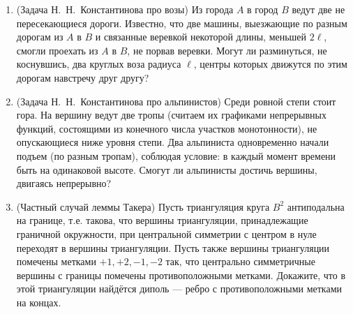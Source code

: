 \documentclass[12pt]{article}
\renewcommand{\le}{\leqslant}
\def\ra{\rightarrow}
\def\RR{\mathbb{R}}
\begin{document}
\begin{enumerate}
  \item (Задача Н.~Н.~Константинова про возы) Из города $A$ в город $B$ ведут две не пересекающиеся дороги. Известно, что две машины, выезжающие по разным дорогам из $A$ в $B$ и связанные веревкой некоторой длины, меньшей $2\ell$, смогли проехать из $A$ в $B$, не порвав веревки. Могут ли разминуться, не коснувшись, два круглых воза радиуса $\ell$, центры которых движутся по этим дорогам навстречу друг другу?

  \item (Задача Н.~Н.~Константинова про альпинистов) Среди ровной степи стоит гора. На вершину ведут две тропы (считаем их графиками непрерывных функций, состоящими из конечного числа участков монотонности), не опускающиеся ниже уровня степи. Два альпиниста одновременно начали подъем (по разным тропам), соблюдая условие: в каждый момент времени быть на одинаковой высоте. Смогут ли альпинисты достичь вершины, двигаясь непрерывно?

    \item (Частный случай леммы Такера) Пусть триангуляция круга $B^2$ антиподальна на границе, т.е. такова, что вершины триангуляции, принадлежащие граничной окружности, при центральной симметрии с центром в нуле переходят в вершины триангуляции. Пусть также вершины триангуляции помечены метками $+1,+2,-1,-2$ так, что центрально симметричные вершины с границы помечены противоположными метками. Докажите, что в этой триангуляции найдётся диполь --- ребро с противоположными метками на концах.

%
%
%
%


\end{enumerate}
\end{document}
